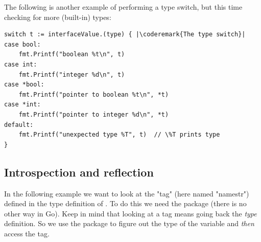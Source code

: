 The following is another example of performing a type switch, but this
time checking for more (built-in) types:
\begin{lstlisting}[caption=A more generic type switch]
switch t := interfaceValue.(type) { |\coderemark{The type switch}|
case bool:
    fmt.Printf("boolean %t\n", t)
case int:
    fmt.Printf("integer %d\n", t)
case *bool:
    fmt.Printf("pointer to boolean %t\n", *t)
case *int:
    fmt.Printf("pointer to integer %d\n", *t)
default:
    fmt.Printf("unexpected type %T", t)  // \%T prints type
}
\end{lstlisting}

\subsection{Introspection and reflection}
\label{subsec:introspection and reflection}
In the following example we want to look at the "tag" (here named
"namestr") defined in the
type definition of . To do this we need the
 package (there is no other way in Go). Keep in mind
that looking at a tag means going back the \emph{type} definition. So
we use the package to figure out the type of the variable
and \emph{then} access the tag.


\showremarks

